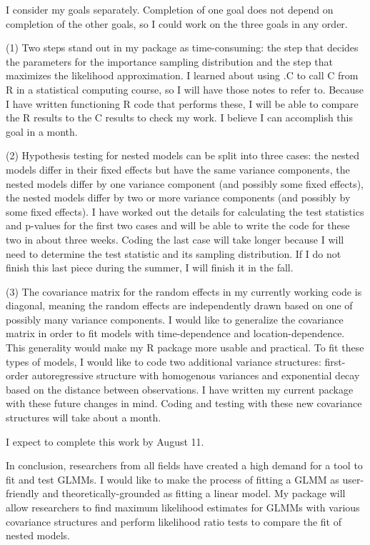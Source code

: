 \documentclass[12pt]{article}
\begin{document}

I consider my  goals separately. Completion of one goal does not depend on completion of the other goals, so I could work on the three goals in any order.

(1) Two steps stand out in my package as time-consuming: the step that decides the parameters for the importance sampling distribution and the step that maximizes the likelihood approximation. I learned about using .C to call C from R in a statistical computing course, so I will have those notes to refer to. Because I have written functioning R code that performs these, I will be able to compare the R results to the C results to check my work.  I believe I can accomplish this goal in a month.

(2)  Hypothesis testing for nested models can be split into three cases: the nested models differ in their fixed effects but have the same variance components, the nested models differ by one variance component (and possibly some fixed effects), the nested models differ by two or more variance components (and possibly by some fixed effects). I have worked out the details for calculating the test statistics and p-values for the first two cases and will  be able to write the code for these two in about three weeks.  Coding the last case will take longer because I will need to determine the test statistic and its sampling distribution.  If I do not finish this last piece during the summer, I will finish it in the fall.  

(3) The covariance matrix for the random effects in my currently working code is diagonal, meaning the random effects are independently drawn based on one of possibly many variance components.  I would like to generalize the covariance matrix in order to fit models with time-dependence and location-dependence.  This generality would make my R package more usable and practical.  To fit these types of models, I would like to code two additional variance structures:  first-order autoregressive structure with homogenous variances and exponential decay based on the distance between observations.  I have written my current package with these future changes in mind. Coding and testing with these new covariance structures will take about a month.

I expect to complete this work by August 11.


In conclusion, researchers from all fields have created a high demand for a tool to fit and test GLMMs. I would like to make the process of fitting a GLMM as user-friendly and theoretically-grounded as fitting a linear model. My package will allow researchers to find maximum likelihood estimates for GLMMs with various covariance structures and perform likelihood ratio tests to compare the fit of nested models.

\vspace{-2.3cm}
\renewcommand{\refname}{}


\end{document}
